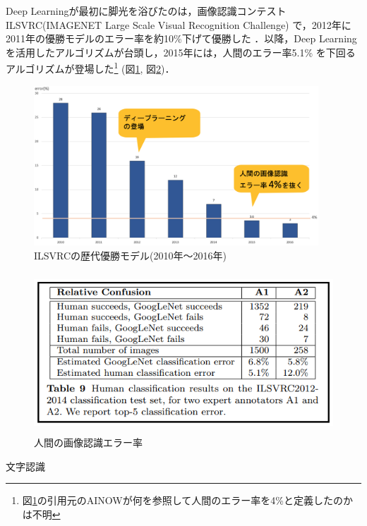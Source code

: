 \documentclass[11pt,a4paper]{jsarticle}
\begin{document}
Deep Learningが最初に脚光を浴びたのは，画像認識コンテスト ILSVRC(IMAGENET Large Scale Visual Recognition Challenge) \cite{overview_ilsvrc}で，2012年に2011年の優勝モデルのエラー率を約10\%下げて優勝した \cite{dl_hist4}．以降，Deep Learningを活用したアルゴリズムが台頭し，2015年には，人間のエラー率5.1\% \cite{arxiv_ilsvrc}を下回るアルゴリズムが登場した\footnote{図\ref{ilsvrc_winner_2010-2016}の引用元のAINOWが何を参照して人間のエラー率を4\%と定義したのかは不明} (図\ref{ilsvrc_winner_2010-2016}, 図\ref{ilsvrc_human_classification_results})．

\begin{figure} [H]
	\begin{center}
		\includegraphics[clip, height=6cm, bb=0 0 1976 1112]{data/figure/ilsvrc_winner_2010-2016.png}
		\caption{ILSVRCの歴代優勝モデル(2010年～2016年)}
		\label{ilsvrc_winner_2010-2016}
	\end{center}
\end{figure}

\begin{figure} [H]
	\begin{center}
		\includegraphics[clip, height=6cm, bb=-120 0 568 278]{data/figure/ilsvrc_human_classification_results.png}
		\caption{人間の画像認識エラー率}
		\label{ilsvrc_human_classification_results}
	\end{center}
\end{figure}文字認識
\end{document}
